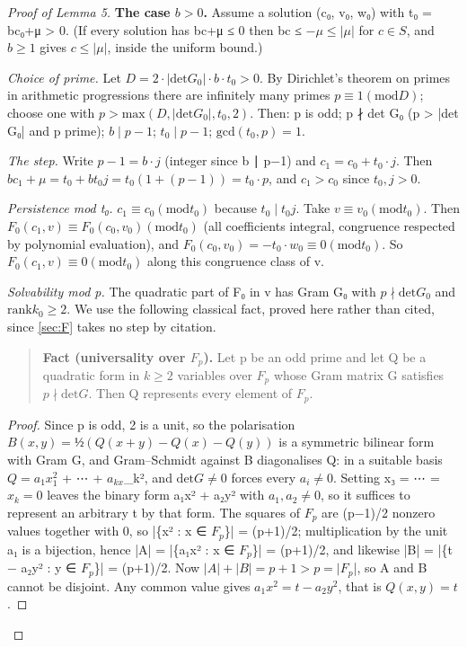 \documentclass[11pt]{article}
\theoremstyle{plain}
\theoremstyle{definition}
\theoremstyle{remark}
\theoremstyle{plain}
\theoremstyle{definition}
\theoremstyle{remark}
\theoremstyle{plain}
\theoremstyle{definition}
\theoremstyle{remark}
\newenvironment{displaytext}{\par\medskip\begin{quote}\raggedright\setlength{\parskip}{0pt}}{\end{quote}\medskip}
\begin{document}
\begin{proof}[Proof of Lemma 5]
\textbf{The case $b > 0$.} Assume a solution (c₀, v₀, w₀) with t₀ = bc₀+μ > 0. (If every solution has bc+μ ≤ 0 then bc ≤ $−μ ≤ |μ|$ for $c ∈ S$, and $b ≥ 1$ gives $c ≤ |μ|$, inside the uniform bound.)

\emph{Choice of prime.} Let $D = 2·|\mathrm{det} G_{0}|·b·t_{0} > 0$. By Dirichlet's theorem on primes in arithmetic progressions there are infinitely many primes $p ≡ 1 (\mathrm{mod} D)$; choose one with $p > \mathrm{max}(D, |\mathrm{det} G_{0}|, t_{0}, 2)$. Then: p is odd; p ∤ det G₀ (p > |det G₀| and p prime); $b ∣ p−1$; $t_{0} ∣ p−1$; $\mathrm{gcd}(t_{0}, p) = 1$.

\emph{The step.} Write $p−1 = b·j$ (integer since b ∣ p−1) and $c_{1} = c_{0} + t_{0}·j$. Then $b c_{1} + μ = t_{0} + b t_{0} j = t_{0}(1 + (p−1)) = t_{0}·p$, and $c_{1} > c_{0}$ since $t_{0}, j > 0$.

\emph{Persistence mod t₀.} $c_{1} ≡ c_{0} (\mathrm{mod} t_{0})$ because $t_{0} ∣ t_{0}j$. Take $v ≡ v_{0} (\mathrm{mod} t_{0})$. Then $F_{0}(c_{1}, v) ≡ F_{0}(c_{0}, v_{0}) (\mathrm{mod} t_{0})$ (all coefficients integral, congruence respected by polynomial evaluation), and $F_{0}(c_{0}, v_{0}) = −t_{0}·w_{0} ≡ 0 (\mathrm{mod} t_{0})$. So $F_{0}(c_{1}, v) ≡ 0 (\mathrm{mod} t_{0})$ along this congruence class of v.

\emph{Solvability mod p.} The quadratic part of F₀ in v has Gram G₀ with $p ∤ \mathrm{det} G_{0}$ and $\mathrm{rank} k_{0} ≥ 2$. We use the following classical fact, proved here rather than cited, since \cref{sec:F} takes no step by citation.

\begin{displaytext}
\textbf{Fact (universality over $F_{p}$).} Let p be an odd prime and let Q be a quadratic form in $k ≥ 2$ variables over $F_{p}$ whose Gram matrix G satisfies $p ∤ \mathrm{det} G$. Then Q represents every element of $F_{p}$.
\end{displaytext}

\begin{proof}
Since p is odd, 2 is a unit, so the polarisation $B(x,y) = ½(Q(x+y) − Q(x) − Q(y))$ is a symmetric bilinear form with Gram G, and Gram–Schmidt against B diagonalises Q: in a suitable basis $Q = a_{1}x_{1}^{2}$ + ⋯ + $a_{kx}$\_k², and $\mathrm{det} G ≠ 0$ forces every $a_{i} ≠ 0$. Setting x₃ = ⋯ = $x_{k} = 0$ leaves the binary form a₁x² + a₂y² with $a_{1}, a_{2} ≠ 0$, so it suffices to represent an arbitrary t by that form. The squares of $F_{p}$ are (p−1)/2 nonzero values together with 0, so |\{x² : x ∈ $F_{p}$\}| = (p+1)/2; multiplication by the unit a₁ is a bijection, hence |A| = |\{a₁x² : x ∈ $F_{p}$\}| = (p+1)/2, and likewise |B| = |\{t − a₂y² : y ∈ $F_{p}$\}| = (p+1)/2. Now $|A| + |B| = p + 1 > p = |F_{p}$|, so A and B cannot be disjoint. Any common value gives $a_{1}x^{2} = t − a_{2}y^{2}$, that is $Q(x, y) = t$.
\end{proof}


\end{proof}
\end{document}
